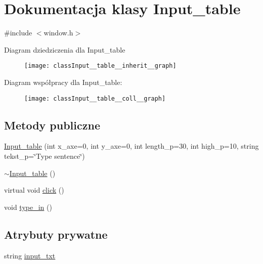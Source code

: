 \hypertarget{classInput__table}{}\section{Dokumentacja klasy Input\+\_\+table}
\label{classInput__table}


{\ttfamily \#include $<$window.\+h$>$}



Diagram dziedziczenia dla Input\+\_\+table\nopagebreak
\begin{figure}[H]
\begin{center}
\leavevmode
\texttt{[image: classInput\_\_table\_\_inherit\_\_graph]}
\end{center}
\end{figure}


Diagram współpracy dla Input\+\_\+table\+:\nopagebreak
\begin{figure}[H]
\begin{center}
\leavevmode
\texttt{[image: classInput\_\_table\_\_coll\_\_graph]}
\end{center}
\end{figure}
\subsection*{Metody publiczne}
\begin{DoxyCompactItemize}
\item 
\hyperlink{classInput__table_a45587a7a164f060d4bc10e30e2226e5d}{Input\+\_\+table} (int x\+\_\+axe=0, int y\+\_\+axe=0, int length\+\_\+p=30, int high\+\_\+p=10, string tekst\+\_\+p=\char`\"{}Type sentence\char`\"{})
\item 
\hyperlink{classInput__table_a22e1bdc68b3b830a03474b4897c6d47e}{$\sim$\+Input\+\_\+table} ()
\item 
virtual void \hyperlink{classInput__table_ac48806d103ed557c4b9a4eac4a021cf3}{click} ()
\item 
void \hyperlink{classInput__table_a6a4752b474d1a42c9f48bbb1e8af82a8}{type\+\_\+in} ()
\end{DoxyCompactItemize}
\subsection*{Atrybuty prywatne}
\begin{DoxyCompactItemize}
\item 
string \hyperlink{classInput__table_a02d0203e61ec0d7d5954d1fb2ef2c56b}{input\+\_\+txt}
\end{DoxyCompactItemize}


